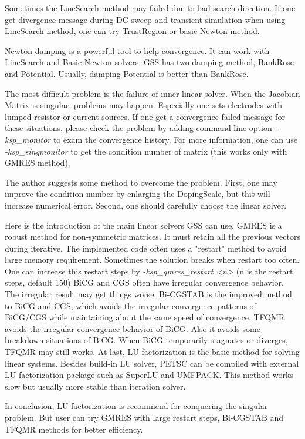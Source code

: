\documentclass[11pt,pdftex]{article}
\begin{document}
Sometimes the LineSearch method may failed due to bad search
direction. If one get divergence message during DC sweep and
transient simulation when using LineSearch method, one can try
TrustRegion or basic Newton method.

Newton damping is a powerful tool to help convergence. It can work
with LineSearch and Basic Newton solvers. GSS has two damping
method, BankRose and Potential. Usually, damping Potential is better
than BankRose.

The most difficult problem is the failure of inner linear solver.
When the Jacobian Matrix is singular, problems may happen.
Especially one sets electrodes with lumped resistor or current
sources. If one get a convergence failed message for these
situations, please check the problem by adding command line option
\textit{-ksp\_monitor} to exam the convergence history. For more
information, one can use \textit{-ksp\_singmonitor} to get the
condition number of matrix (this works only with GMRES method).

The author suggests some method to overcome the problem. First, one
may improve the condition number by enlarging the DopingScale, but
this will increase numerical error. Second, one should carefully
choose the linear solver.

Here is the introduction of the main linear solvers GSS can use.
GMRES is a robust method for non-symmetric matrices. It must retain
all the previous vectors during iterative. The implemented code
often uses a "restart" method to avoid large memory requirement.
Sometimes the solution breaks when restart too often. One can
increase this restart steps by \textit{-ksp\_gmres\_restart <n>} (n
is the restart steps, default 150) BiCG and CGS often have irregular
convergence behavior. The irregular result may get things worse.
Bi-CGSTAB is the improved method to BiCG and CGS, which avoids the
irregular convergence patterns of BiCG/CGS while maintaining about
the same speed of convergence. TFQMR avoids the irregular
convergence behavior of BiCG. Also it avoids some breakdown
situations of BiCG. When BiCG temporarily stagnates or diverges,
TFQMR may still works. At last, LU factorization is the basic method
for solving linear systems. Besides build-in LU solver, PETSC can be
compiled with external LU factorization package such as SuperLU and
UMFPACK. This method works slow but usually more stable than
iteration solver.

In conclusion, LU factorization is recommend for conquering the
singular problem. But user can try GMRES with large restart steps,
Bi-CGSTAB and TFQMR methods for better efficiency.
\end{document}
